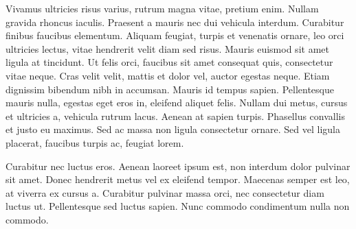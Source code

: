 \documentclass{article}
\begin{document}
Vivamus ultricies risus varius, rutrum magna vitae, pretium enim. Nullam gravida rhoncus iaculis. Praesent a mauris nec dui vehicula interdum. Curabitur finibus faucibus elementum. Aliquam feugiat, turpis et venenatis ornare, leo orci ultricies lectus, vitae hendrerit velit diam sed risus. Mauris euismod sit amet ligula at tincidunt. Ut felis orci, faucibus sit amet consequat quis, consectetur vitae neque. Cras velit velit, mattis et dolor vel, auctor egestas neque. Etiam dignissim bibendum nibh in accumsan. Mauris id tempus sapien. Pellentesque mauris nulla, egestas eget eros in, eleifend aliquet felis. Nullam dui metus, cursus et ultricies a, vehicula rutrum lacus. Aenean at sapien turpis. Phasellus convallis et justo eu maximus. Sed ac massa non ligula consectetur ornare. Sed vel ligula placerat, faucibus turpis ac, feugiat lorem.

Curabitur nec luctus eros. Aenean laoreet ipsum est, non interdum dolor pulvinar sit amet. Donec hendrerit metus vel ex eleifend tempor. Maecenas semper est leo, at viverra ex cursus a. Curabitur pulvinar massa orci, nec consectetur diam luctus ut. Pellentesque sed luctus sapien. Nunc commodo condimentum nulla non commodo.
\end{document}
